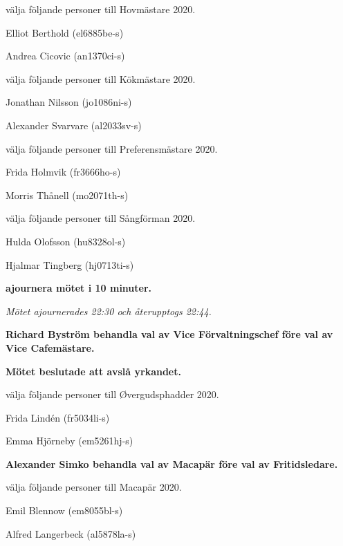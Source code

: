 \documentclass[10pt]{article}
\begin{document}
\begin{paragrafer}
\begin{paralist}
    \Mba välja följande personer till Hovmästare 2020.
    \begin{tightdashlist}
        \item Elliot Berthold (el6885be-s)
        \item Andrea Cicovic (an1370ci-s)
    \end{tightdashlist}

    \Mba välja följande personer till Kökmästare 2020.
    \begin{tightdashlist}
        \item Jonathan Nilsson (jo1086ni-s)
        \item Alexander Svarvare (al2033sv-s)
    \end{tightdashlist}

    \Mba välja följande personer till Preferensmästare 2020. 
    \begin{tightdashlist}
        \item Frida Holmvik (fr3666ho-s)
        \item Morris Thånell (mo2071th-s)
    \end{tightdashlist}

    \Mba välja följande personer till Sångförman 2020. 
    \begin{tightdashlist}
        \item Hulda Olofsson (hu8328ol-s)
        \item Hjalmar Tingberg (hj0713ti-s)
    \end{tightdashlist}

    \textbf{\Mba ajournera mötet i 10 minuter.}

    \emph{Mötet ajournerades 22:30 och återupptogs 22:44.}

    \textbf{Richard Byström \ypa behandla val av Vice Förvaltningschef före val av Vice Cafemästare.} 

    \textbf{Mötet beslutade att avslå yrkandet.}

    \Mba välja följande personer till Øvergudsphadder 2020.
    \begin{tightdashlist}
        \item Frida Lindén (fr5034li-s)
        \item Emma Hjörneby (em5261hj-s)
    \end{tightdashlist}

    \textbf{Alexander Simko \ypa behandla val av Macapär före val av Fritidsledare.}

    \textbf{\Mbaby}

    \Mba välja följande personer till Macapär 2020.
    \begin{tightdashlist}
        \item Emil Blennow (em8055bl-s)
        \item Alfred Langerbeck (al5878la-s)
    \end{tightdashlist}


\end{paralist}
\end{paragrafer}
\end{document}

